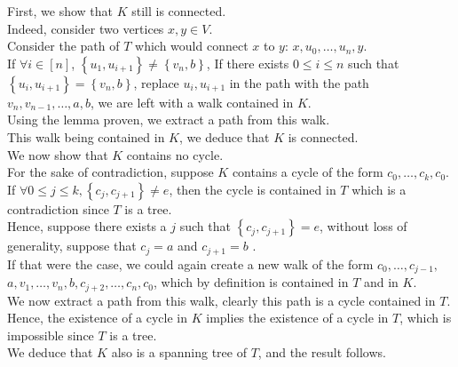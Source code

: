 \documentclass[11pt, a4paper]{article}
\begin{document}
First, we show that $K$ still is connected.\\
Indeed, consider two vertices $x,y \in V$.\\
Consider the path of $T$ which would connect $x$ to $y$: $x, u_0,\ldots, u_n, y$.\\
If $\forall i \in [ n] $, $ \left\{ u_1, u_{i+1}  \right\} \neq \left\{ v_n,b \right\} $, 
If there exists $0 \leq i \leq n$ such that $ \left\{ u_i, u_{i+1}  \right\} = \left\{ v_n,b \right\}  $, replace $ u_i, u_{i+1} $ in the path with the path $v_n, v_{n-1} ,\ldots, a, b$, we are left with a walk contained in $K$.\\
Using the lemma proven, we extract a path from this walk.\\
This walk being contained in $K$, we deduce that $K$ is connected.\\

We now show that $K$ contains no cycle.\\
For the sake of contradiction, suppose $K$ contains a cycle of the form $c_0, \ldots, c_k, c_0$.\\
If $\forall 0 \leq j \leq k, \left\{ c_j, c_{j+1}  \right\} \neq e$, then the cycle is contained in $T$ which is a contradiction since $T$ is a tree.\\
Hence, suppose there exists a $j$ such that $ \left\{ c_j, c_{j+1}  \right\} = e$, without loss of generality, suppose that $c_j =a$ and $c_{j+1} =b$	.\\
If that were the case, we could again create a new walk of the form $ c_0, \ldots, c_{j-1} ,$ $ a,v_1 ,  \ldots, v_n, b , c_{j+2} ,\ldots, c_n, c_0 $, which by definition is contained in $T$ and in $K$.\\
We now extract a path from this walk, clearly this path is a cycle contained in $T$.\\
Hence, the existence of a cycle in $K$ implies the existence of a cycle in $T$, which is impossible since $T$ is a tree.\\
\hr
We deduce that $K$ also is a spanning tree of $T$, and the result follows.
\end{document}
